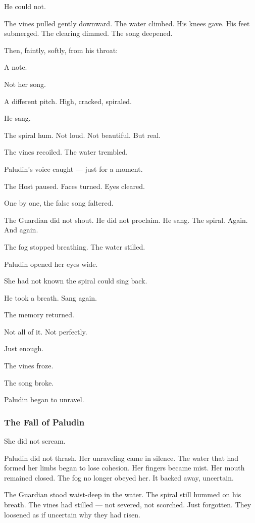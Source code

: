 \documentclass[12pt]{article}
\begin{document}
He could not.

The vines pulled gently downward. The water climbed. His knees gave. His feet submerged. The clearing dimmed. The song deepened.

Then, faintly, softly, from his throat:

A note.

Not her song.

A different pitch. High, cracked, spiraled.

He sang.

The spiral hum. Not loud. Not beautiful. But real.

The vines recoiled. The water trembled.

Paludin’s voice caught — just for a moment.

The Host paused. Faces turned. Eyes cleared.

One by one, the false song faltered.

The Guardian did not shout. He did not proclaim. He sang. The spiral. Again. And again.

The fog stopped breathing. The water stilled.

Paludin opened her eyes wide.

She had not known the spiral could sing back.

He took a breath. Sang again.

The memory returned.

Not all of it. Not perfectly.

Just enough.

The vines froze.

The song broke.

Paludin began to unravel.

\dotfill

\subsubsection{The Fall of Paludin}

She did not scream.

Paludin did not thrash. Her unraveling came in silence. The water that had formed her limbs began to lose cohesion. Her fingers became mist. Her mouth remained closed. The fog no longer obeyed her. It backed away, uncertain.

The Guardian stood waist-deep in the water. The spiral still hummed on his breath. The vines had stilled — not severed, not scorched. Just forgotten. They loosened as if uncertain why they had risen.
\end{document}
